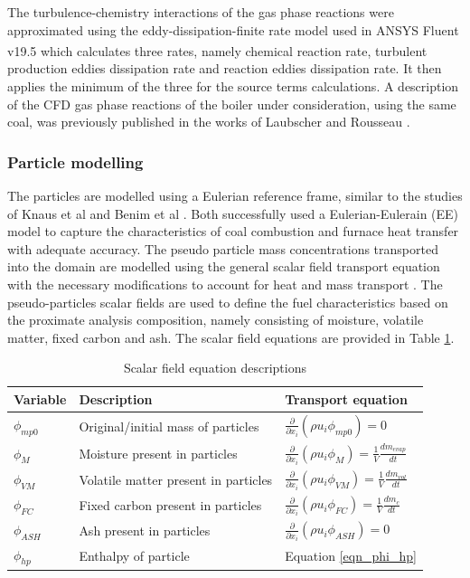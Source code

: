 \documentclass[review]{elsarticle}
\begin{document}
The turbulence-chemistry interactions of the gas phase reactions were approximated using the eddy-dissipation-finite rate model used in ANSYS Fluent v19.5\textsuperscript{\textregistered} which calculates three rates, namely chemical reaction rate, turbulent production eddies dissipation rate and reaction eddies dissipation rate. It then applies the minimum of the three for the source terms calculations. A description of the CFD gas phase reactions of the boiler under consideration, using the same coal, was previously published in the works of Laubscher and Rousseau \cite{Laubscher2019b}.

\subsubsection{Particle modelling}
The particles are modelled using a Eulerian reference frame, similar to the studies of Knaus et al \cite{Knaus2001a} and Benim et al \cite{Benim2005}. Both successfully used a Eulerian-Eulerain (EE) model to capture the characteristics of coal combustion and furnace heat transfer with adequate accuracy. The pseudo particle mass concentrations transported into the domain are modelled using the general scalar field transport equation with the necessary modifications to account for heat and mass transport \cite{Versteeg2007}. The pseudo-particles scalar fields are used to define the fuel characteristics based on the proximate analysis composition, namely consisting of moisture, volatile matter, fixed carbon and ash. The scalar field equations are provided in Table \ref{tab_scalars}.\\

\begin{table}[h!]
\centering
\caption{Scalar field equation descriptions}\label{tab_scalars}  
\vspace{2mm}     
\begin{tabular}{lll}
\hline
Variable &Description& Transport equation \\
\hline
$\phi_{mp0}$ &Original/initial mass of particles& $\frac{\partial}{\partial x_{i}}(\rho u_{i} \phi_{mp0})=0$\\
$\phi_{M}$&Moisture present in particles&$\frac{\partial}{\partial x_{i}}(\rho u_{i} \phi_{M})=\frac{1}{V} \frac{dm_{evap}}{dt}$\\
$\phi_{VM}$&Volatile matter present in particles&  $\frac{\partial}{\partial x_{i}}(\rho u_{i} \phi_{VM})=\frac{1}{V}\frac{dm_{vol}}{dt}$\\
$\phi_{FC}$&Fixed carbon present in particles&$\frac{\partial}{\partial x_{i}}(\rho u_{i} \phi_{FC})=\frac{1}{V}\frac{dm_c}{dt}$\\
$\phi_{ASH}$&Ash present in particles&$\frac{\partial}{\partial x_{i}}(\rho u_{i} \phi_{ASH})=0$\\
$\phi_{hp}$&Enthalpy of particle&Equation \eqref{eqn_phi_hp}\\
\hline
\end{tabular}
\end{table}
\end{document}
